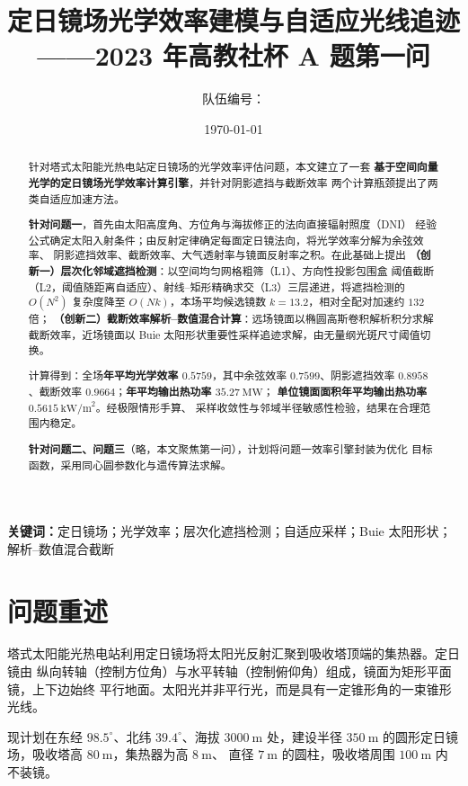 \documentclass[12pt,a4paper]{ctexart}
\title{\heiti 定日镜场光学效率建模与自适应光线追迹 \\[4pt]
       \large ——2023 年高教社杯 A 题第一问}
\author{队伍编号：\underline{\hspace{4em}}}
\date{\today}
\begin{document}
\maketitle

\begin{abstract}
\noindent 针对塔式太阳能光热电站定日镜场的光学效率评估问题，本文建立了一套
\textbf{基于空间向量光学的定日镜场光学效率计算引擎}，并针对阴影遮挡与截断效率
两个计算瓶颈提出了两类自适应加速方法。

\textbf{针对问题一}，首先由太阳高度角、方位角与海拔修正的法向直接辐射照度（DNI）
经验公式确定太阳入射条件；由反射定律确定每面定日镜法向，将光学效率分解为余弦效率、
阴影遮挡效率、截断效率、大气透射率与镜面反射率之积。在此基础上提出
\textbf{（创新一）层次化邻域遮挡检测}：以空间均匀网格粗筛（L1）、方向性投影包围盒
阈值截断（L2，阈值随距离自适应）、射线--矩形精确求交（L3）三层递进，将遮挡检测的
$O(N^2)$ 复杂度降至 $O(Nk)$，本场平均候选镜数 $k=13.2$，相对全配对加速约 $132$ 倍；
\textbf{（创新二）截断效率解析--数值混合计算}：远场镜面以椭圆高斯卷积解析积分求解
截断效率，近场镜面以 Buie 太阳形状重要性采样追迹求解，由无量纲光斑尺寸阈值切换。

计算得到：全场\textbf{年平均光学效率 $0.5759$}，其中余弦效率 $0.7599$、阴影遮挡效率
$0.8958$、截断效率 $0.9664$；\textbf{年平均输出热功率 $35.27\ \text{MW}$}；
\textbf{单位镜面面积年平均输出热功率 $0.5615\ \text{kW/m}^2$}。经极限情形手算、
采样收敛性与邻域半径敏感性检验，结果在合理范围内稳定。

\textbf{针对问题二、问题三}（略，本文聚焦第一问），计划将问题一效率引擎封装为优化
目标函数，采用同心圆参数化与遗传算法求解。
\end{abstract}

\noindent\textbf{关键词：}定日镜场；光学效率；层次化遮挡检测；自适应采样；Buie 太阳形状；
解析--数值混合截断

\section{问题重述}
塔式太阳能光热电站利用定日镜场将太阳光反射汇聚到吸收塔顶端的集热器。定日镜由
纵向转轴（控制方位角）与水平转轴（控制俯仰角）组成，镜面为矩形平面镜，上下边始终
平行地面。太阳光并非平行光，而是具有一定锥形角的一束锥形光线。

现计划在东经 $98.5^\circ$、北纬 $39.4^\circ$、海拔 $3000\ \text{m}$ 处，建设半径
$350\ \text{m}$ 的圆形定日镜场，吸收塔高 $80\ \text{m}$，集热器为高 $8\ \text{m}$、
直径 $7\ \text{m}$ 的圆柱，吸收塔周围 $100\ \text{m}$ 内不装镜。
\end{document}
